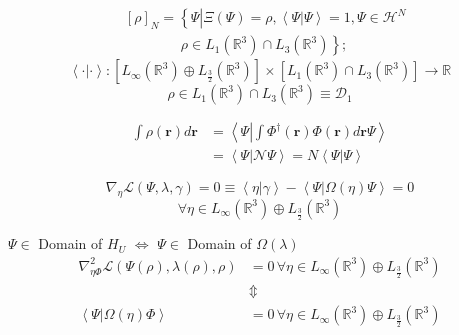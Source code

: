 \documentclass[prl,twocolumn]{revtex4}%
\begin{document}
\begin{align*}
&  \left[  \rho\right]  _{N}=\left\{  \left.  \overset{}{\Psi}\right\vert
\Xi\left(  \Psi\right)  =\rho,\left\langle \left.  \Psi\right\vert
\Psi\right\rangle =1,\Psi\in\mathcal{H}^{N}\right. \\
&  \qquad\qquad\left.  \rho\in L_{1}\left(  \mathbb{R}^{3}\right)  \cap
L_{3}\left(  \mathbb{R}^{3}\right)  \underset{}{}\right\}  ;
\end{align*}%
\[
\left\langle \cdot|\cdot\right\rangle :\left[  L_{\infty}\left(
\mathbb{R}^{3}\right)  \oplus L_{\frac{3}{2}}\left(  \mathbb{R}^{3}\right)
\right]  \times\left[  L_{1}\left(  \mathbb{R}^{3}\right)  \cap L_{3}\left(
\mathbb{R}^{3}\right)  \right]  \rightarrow\mathbb{R}%
\]%
\[
\rho\in L_{1}\left(  \mathbb{R}^{3}\right)  \cap L_{3}\left(  \mathbb{R}%
^{3}\right)  \equiv\mathcal{D}_{1}%
\]
%

\begin{align*}
\int\rho\left(  \mathbf{r}\right)  d\mathbf{r}  &  =\left\langle
\Psi\left\vert \int\Phi^{\dagger}\left(  \mathbf{r}\right)  \Phi\left(
\mathbf{r}\right)  d\mathbf{r}\Psi\right.  \right\rangle \\
&  =\left\langle \left.  \Psi\right\vert \mathcal{N}\Psi\right\rangle
=N\left\langle \left.  \Psi\right\vert \Psi\right\rangle
\end{align*}
%

\[
\nabla_{\eta}\mathcal{L}\left(  \Psi,\lambda,\gamma\right)  =0\equiv
\left\langle \eta\left\vert \gamma\right.  \right\rangle -\left\langle \left.
\Psi\right\vert \Omega\left(  \eta\right)  \Psi\right\rangle =0
\]%
\[
\forall\eta\in L_{\infty}\left(  \mathbb{R}^{3}\right)  \oplus L_{\frac{3}{2}%
}\left(  \mathbb{R}^{3}\right)
\]


$\Psi\in$ Domain of $H_{U}$ $\Leftrightarrow$ $\Psi\in$ Domain of
$\Omega\left(  \lambda\right)  $
\begin{align*}
\nabla_{\eta\Phi}^{2}\mathcal{L}\left(  \Psi\left(  \rho\right)
,\lambda\left(  \rho\right)  ,\rho\right)   &  =0\,\forall\eta\in L_{\infty
}\left(  \mathbb{R}^{3}\right)  \oplus L_{\frac{3}{2}}\left(  \mathbb{R}%
^{3}\right) \\
&  \Updownarrow\\
\left\langle \left.  \Psi\right\vert \Omega\left(  \eta\right)  \Phi
\right\rangle  &  =0\,\forall\eta\in L_{\infty}\left(  \mathbb{R}^{3}\right)
\oplus L_{\frac{3}{2}}\left(  \mathbb{R}^{3}\right)
\end{align*}
%
\end{document}
